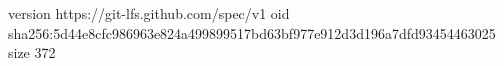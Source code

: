 version https://git-lfs.github.com/spec/v1
oid sha256:5d44e8cfc986963e824a499899517bd63bf977e912d3d196a7dfd93454463025
size 372
